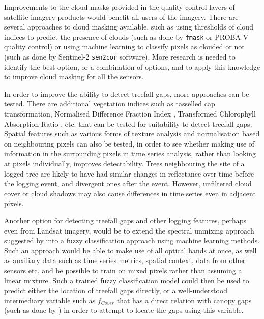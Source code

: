 \documentclass[a4paper,12pt]{scrbook}
\begin{document}
Improvements to the cloud masks provided in the quality control layers of satellite imagery products would benefit all users of the imagery. There are several approaches to cloud masking available, such as using thresholds of cloud indices to predict the presence of clouds (such as done by \texttt{fmask} or PROBA-V quality control) or using machine learning to classify pixels as clouded or not (such as done by Sentinel-2 \texttt{sen2cor} software). More research is needed to identify the best option, or a combination of options, and to apply this knowledge to improve cloud masking for all the sensors.

In order to improve the ability to detect treefall gaps, more approaches can be tested. There are additional vegetation indices such as tasselled cap transformation, Normalised Difference Fraction Index \citep{souza_combining_2005}, Transformed Chlorophyll Absorption Ratio \citep{haboudane_integrated_2002}, etc. that can be tested for suitability to detect treefall gaps. Spatial features such as various forms of texture analysis and normalisation based on neighbouring pixels can also be tested, in order to see whether making use of information in the surrounding pixels in time series analysis, rather than looking at pixels individually, improves detectability. Trees neighbouring the site of a logged tree are likely to have had similar changes in reflectance over time before the logging event, and divergent ones after the event. However, unfiltered cloud cover or cloud shadows may also cause differences in time series even in adjacent pixels.

Another option for detecting treefall gaps and other logging features, perhaps even from Landsat imagery, would be to extend the spectral unmixing approach suggested by \citet{asner_canopy_2004} into a fuzzy classification approach using machine learning methods. Such an approach would be able to make use of all optical bands at once, as well as auxiliary data such as time series metrics, spatial context, data from other sensors etc. and be possible to train on mixed pixels rather than assuming a linear mixture. Such a trained fuzzy classification model could then be used to predict either the location of treefall gaps directly, or a well-understood intermediary variable such as $f_{Cover}$ that has a direct relation with canopy gaps (such as done by \citet{bacour_neural_2006}) in order to attempt to locate the gaps using this variable.
\end{document}
